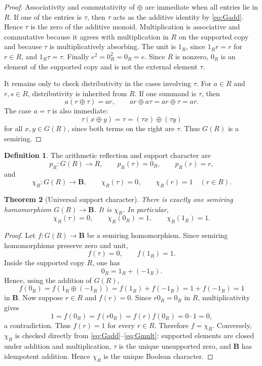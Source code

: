 \documentclass[11pt]{article}
\newcommand{\B}{\mathbf B}
\theoremstyle{plain}
\newtheorem{theorem}{Theorem}[section]
\theoremstyle{definition}
\newtheorem{definition}[theorem]{Definition}
\numberwithin{equation}{section}
\begin{document}
\begin{proof}
Associativity and commutativity of \(\oplus\) are immediate when all entries lie in \(R\).  If one of the entries is \(\tau\), then \(\tau\) acts as the additive identity by \eqref{eq:Gadd}.  Hence \(\tau\) is the zero of the additive monoid.  Multiplication is associative and commutative because it agrees with multiplication in \(R\) on the supported copy and because \(\tau\) is multiplicatively absorbing.  The unit is \(1_R\), since \(1_Rr=r\) for \(r\in R\), and \(1_R\tau=\tau\).  Finally \(e^2=0_R^2=0_R=e\).  Since \(R\) is nonzero, \(0_R\) is an element of the supported copy and is not the external element \(\tau\).

It remains only to check distributivity in the cases involving \(\tau\).  For \(a\in R\) and \(r,s\in R\), distributivity is inherited from \(R\).  If one summand is \(\tau\), then
\[
 a(r\oplus\tau)=ar,
 \qquad
 ar\oplus a\tau=ar\oplus\tau=ar.
\]
The case \(a=\tau\) is also immediate:
\[
 \tau(x\oplus y)=\tau=(\tau x)\oplus(\tau y)
\]
for all \(x,y\in G(R)\), since both terms on the right are \(\tau\).  Thus \(G(R)\) is a semiring.
\end{proof}

\begin{definition}
The arithmetic reflection and support character are
\[
 p_R:G(R)\to R,
 \qquad
 p_R(\tau)=0_R,
 \qquad
 p_R(r)=r,
\]
and
\[
 \chi_R:G(R)\to\B,
 \qquad
 \chi_R(\tau)=0,
 \qquad
 \chi_R(r)=1\quad(r\in R).
\]
\end{definition}

\begin{theorem}[Universal support character]\label{thm:support-character}
There is exactly one semiring homomorphism \(G(R)\to\B\).  It is \(\chi_R\).  In particular,
\[
 \chi_R(\tau)=0,
 \qquad
 \chi_R(0_R)=1,
 \qquad
 \chi_R(1_R)=1.
\]
\end{theorem}

\begin{proof}
Let \(f:G(R)\to\B\) be a semiring homomorphism.  Since semiring homomorphisms preserve zero and unit,
\[
 f(\tau)=0,
 \qquad
 f(1_R)=1.
\]
Inside the supported copy \(R\), one has
\[
 0_R=1_R+(-1_R).
\]
Hence, using the addition of \(G(R)\),
\[
 f(0_R)=f(1_R\oplus(-1_R))=f(1_R)+f(-1_R)=1+f(-1_R)=1
\]
in \(\B\).  Now suppose \(r\in R\) and \(f(r)=0\).  Since \(r0_R=0_R\) in \(R\), multiplicativity gives
\[
 1=f(0_R)=f(r0_R)=f(r)f(0_R)=0\cdot1=0,
\]
a contradiction.  Thus \(f(r)=1\) for every \(r\in R\).  Therefore \(f=\chi_R\).  Conversely, \(\chi_R\) is checked directly from \eqref{eq:Gadd}--\eqref{eq:Gmult}: supported elements are closed under addition and multiplication, \(\tau\) is the unique unsupported zero, and \(\B\) has idempotent addition.  Hence \(\chi_R\) is the unique Boolean character.
\end{proof}
\end{document}

